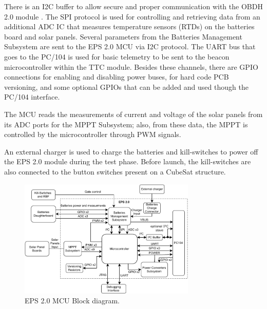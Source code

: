 There is an I2C buffer to allow secure and proper communication with the OBDH 2.0 module \cite{obdh2}.
The SPI protocol is used for controlling and retrieving data from an additional ADC IC that measures temperature sensors (RTDs) on the batteries board and solar panels.
Several parameters from the Batteries Management Subsystem are sent to the EPS 2.0 MCU via I2C protocol.
The UART bus that goes to the PC/104 is used for basic telemetry to be sent to the beacon microcontroller within the TTC module.
Besides these channels, there are GPIO connections for enabling and disabling power buses, for hard code PCB versioning, and some optional GPIOs that can be added and used though the PC/104 interface. 

The MCU reads the measurements of current and voltage of the solar panels from its ADC ports for the MPPT Subsystem; also, from these data, the MPPT is controlled by the microcontroller through PWM signals.

An external charger is used to charge the batteries and kill-switches to power off the EPS 2.0 module during the test phase. Before launch, the kill-switches are also connected to the button switches present on a CubeSat structure.   

\begin{figure}[!ht]
    \begin{center}
        \includegraphics[width=0.75\textwidth]{figures/eps2_mcu_diagram.pdf}
        \caption{EPS 2.0 MCU Block diagram.}
        \label{fig:mcu-block-diagram}
    \end{center}
\end{figure}

